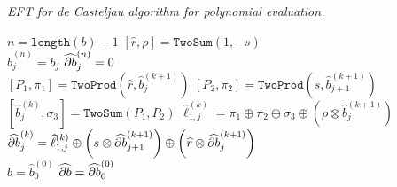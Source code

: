 \begin{breakablealgorithm}
  \caption{\textit{EFT for de Casteljau algorithm for polynomial evaluation.}}
  \label{alg:eft-de-casteljau}

  \begin{algorithmic}
      \State \(n = \texttt{length}(b) - 1\)
      \State \(\left[\widehat{r}, \rho\right] = \mathtt{TwoSum}(1, -s)\)
      \\
        \State \(\widehat{b}_j^{(n)} = b_j\)
        \State \(\cdb{1}_j^{(n)} = 0\)
      \EndFor
      \\
          \State \(\left[P_1, \pi_1\right] = \mathtt{TwoProd}\left(
              \widehat{r}, \widehat{b}_j^{(k + 1)}\right)\)
          \State \(\left[P_2, \pi_2\right] = \mathtt{TwoProd}\left(
              s, \widehat{b}_{j + 1}^{(k + 1)}\right)\)
          \State \(\left[\widehat{b}_j^{(k)}, \sigma_3\right] =
              \mathtt{TwoSum}(P_1, P_2)\)
          \State \(\widehat{\ell}_{1, j}^{(k)} = \pi_1 \oplus \pi_2 \oplus
              \sigma_3 \oplus \left(\rho \otimes
              \widehat{b}_j^{(k + 1)}\right)\)
          \State \(\cdb{1}_j^{(k)} =
              \widehat{\ell}_{1, j}^{(k)} \oplus
              \left(s \otimes \cdb{1}_{j + 1}^{(k + 1)}
              \right) \oplus
              \left(\widehat{r} \otimes
              \cdb{1}_j^{(k + 1)}\right)\)
        \EndFor
      \EndFor
      \\
      \State \(\widehat{b} = \widehat{b}_0^{(0)}\)
      \State \(\widehat{\partial b} = \cdb{1}_0^{(0)}\)
    \EndFunction
  \end{algorithmic}
\end{breakablealgorithm}
